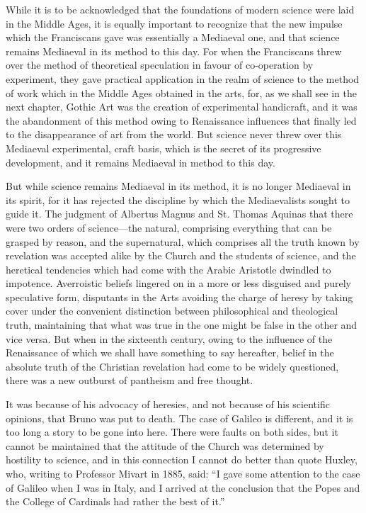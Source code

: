 \documentclass{book}
\begin{document}
While it is to be acknowledged that the foundations of modern science were laid in the Middle Ages, it is equally important to recognize that the new impulse which the Franciscans gave was essentially a Mediaeval one, and that science remains Mediaeval in its method to this day. For when the Franciscans threw over the method of theoretical speculation in favour of co-operation by experiment, they gave practical application in the realm of science to the method of work which in the Middle Ages obtained in the arts, for, as we shall see in the next chapter, Gothic Art was the creation of experimental handicraft, and it was the abandonment of this method owing to Renaissance influences that finally led to the disappearance of art from the world. But science never threw over this Mediaeval experimental, craft basis, which is the secret of its progressive development, and it remains Mediaeval in method to this day.

But while science remains Mediaeval in its method, it is no longer Mediaeval in its spirit, for it has rejected the discipline by which the Mediaevalists sought to guide it. The judgment of Albertus Magnus and St. Thomas Aquinas that there were two orders of science—the natural, comprising everything that can be grasped by reason, and the supernatural, which comprises all the truth known by revelation was accepted alike by the Church and the students of science, and the heretical tendencies which had come with the Arabic Aristotle dwindled to impotence. Averroistic beliefs lingered on in a more or less disguised and purely speculative form, disputants in the Arts avoiding the charge of heresy by taking cover under the convenient distinction between philosophical and theological truth, maintaining that what was true in the one might be false in the other and vice versa. But when in the sixteenth century, owing to the influence of the Renaissance of which we shall have something to say hereafter, belief in the absolute truth of the Christian revelation had come to be widely questioned, there was a new outburst of pantheism and free thought.

It was because of his advocacy of heresies, and not because of his scientific opinions, that Bruno was put to death. The case of Galileo is different, and it is too long a story to be gone into here. There were faults on both sides, but it cannot be maintained that the attitude of the Church was determined by hostility to science, and in this connection I cannot do better than quote Huxley, who, writing to Professor Mivart in 1885, said: “I gave some attention to the case of Galileo when I was in Italy, and I arrived at the conclusion that the Popes and the College of Cardinals had rather the best of it.”\footnotemark[8]
\end{document}
